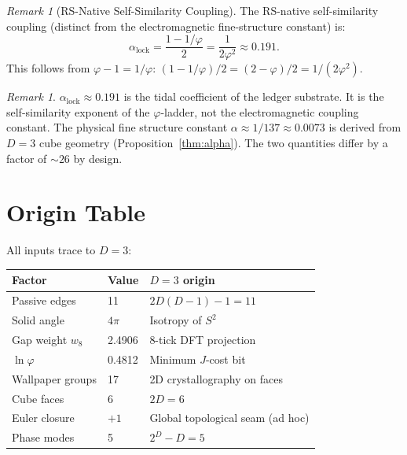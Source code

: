 \documentclass[12pt,a4paper]{article}
\theoremstyle{definition}
\theoremstyle{remark}
\newtheorem{remark}[theorem]{Remark}
\begin{document}
\begin{remark}[RS-Native Self-Similarity Coupling]
\label{thm:lock}
The RS-native self-similarity coupling (distinct from the
electromagnetic fine-structure constant) is:
\begin{equation}
  \alpha_{\mathrm{lock}} = \frac{1 - 1/\varphi}{2}
  = \frac{1}{2\varphi^2} \approx 0.191.
\end{equation}
This follows from $\varphi - 1 = 1/\varphi$:
$(1 - 1/\varphi)/2 = (2 - \varphi)/2 = 1/(2\varphi^2)$.
\end{remark}

\begin{remark}
$\alpha_{\mathrm{lock}} \approx 0.191$ is the tidal coefficient
of the ledger substrate.  It is the self-similarity exponent of
the $\varphi$-ladder, not the electromagnetic coupling constant.
The physical fine structure constant
$\alpha \approx 1/137 \approx 0.0073$ is derived from $D = 3$
cube geometry (Proposition~\ref{thm:alpha}).  The two quantities
differ by a factor of $\sim 26$ by design.
\end{remark}

\section{Origin Table}
\label{sec:origin}

All inputs trace to $D = 3$:

\begin{center}
\renewcommand{\arraystretch}{1.3}
\begin{tabular}{@{}lll@{}}
\toprule
\textbf{Factor} & \textbf{Value} &
\textbf{$D = 3$ origin} \\
\midrule
Passive edges & 11 & $2D(D-1) - 1 = 11$ \\
Solid angle & $4\pi$ & Isotropy of $S^2$ \\
Gap weight $w_8$ & 2.4906 & 8-tick DFT projection \\
$\ln\varphi$ & 0.4812 & Minimum $J$-cost bit \\
Wallpaper groups & 17 & 2D crystallography on faces \\
Cube faces & 6 & $2D = 6$ \\
Euler closure & $+1$ & Global topological seam (ad hoc) \\
Phase modes & 5 & $2^D - D = 5$ \\
\bottomrule
\end{tabular}
\end{center}
\end{document}
